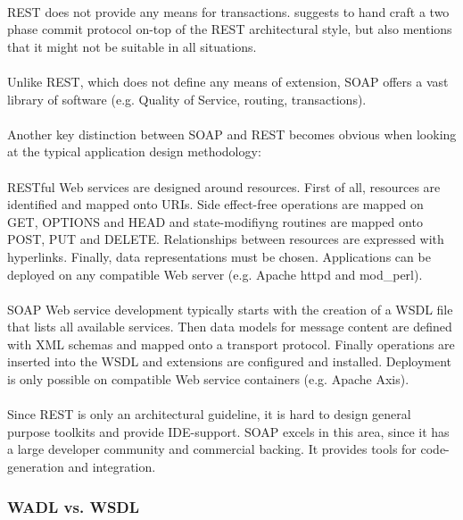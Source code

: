 \\
REST does not provide any means for transactions. \cite{RESTFULWEB} suggests to hand craft a two phase commit protocol on-top of the REST architectural style, but also mentions that it might not be suitable in all situations.
\\ \\
Unlike REST, which does not define any means of extension, SOAP offers a vast library of software (e.g. Quality of Service, routing, transactions).
\\ \\
Another key distinction between SOAP and REST becomes obvious when looking at the typical application design methodology: 
\\ \\
RESTful Web services are designed around resources. First of all, resources are identified and mapped onto URIs. Side effect-free operations are mapped on GET, OPTIONS and HEAD and state-modifiyng routines are mapped onto POST, PUT and DELETE. Relationships between resources are expressed with hyperlinks. Finally, data representations must be chosen. Applications can be deployed on any compatible Web server (e.g. Apache httpd and mod\_perl). \cite{BIGREST}
\\ \\
SOAP Web service development typically starts with the creation of a WSDL file that lists all available services. Then data models for message content are defined with XML schemas and mapped onto a transport protocol. Finally operations are inserted into the WSDL and extensions are configured and installed. Deployment is only possible on compatible Web service containers (e.g. Apache Axis). \cite{BRINGBACKWEB}
\\ \\
Since REST is only an architectural guideline, it is hard to design general purpose toolkits and provide IDE-support. SOAP excels in this area, since it has a large developer community and commercial backing. It provides tools for code-generation and integration. 

\subsubsection{WADL vs. WSDL}

